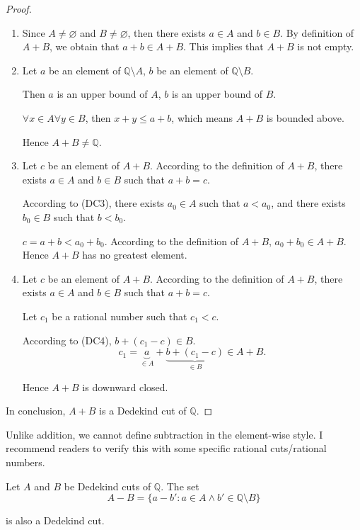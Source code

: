 \begin{proof}
    \begin{enumerate}[label={(\roman*)},itemsep=0pt]
        \item Since $A\ne\varnothing$ and $B\ne\varnothing$, then there exists $a\in A$ and $b\in B$. By definition of $A + B$, we obtain that $a + b \in A + B$. This implies that $A + B$ is not empty.
        \item Let $a$ be an element of $\mathbb{Q}\setminus A$, $b$ be an element of $\mathbb{Q}\setminus B$.

              Then $a$ is an upper bound of $A$, $b$ is an upper bound of $B$.

              $\forall x\in A\forall y\in B$, then $x + y \le a + b$, which means $A + B$ is bounded above.

              Hence $A + B\ne\mathbb{Q}$.
        \item Let $c$ be an element of $A + B$. According to the definition of $A + B$, there exists $a\in A$ and $b\in B$ such that $a + b = c$.

              According to (DC3), there exists $a_{0}\in A$ such that $a < a_{0}$, and there exists $b_{0}\in B$ such that $b < b_{0}$.

              $c = a + b < a_{0} + b_{0}$. According to the definition of $A + B$, $a_{0} + b_{0} \in A + B$. Hence $A + B$ has no greatest element.
        \item Let $c$ be an element of $A + B$. According to the definition of $A + B$, there exists $a\in A$ and $b\in B$ such that $a + b = c$.

              Let $c_{1}$ be a rational number such that $c_{1} < c$.

              According to (DC4), $b + (c_{1} - c)\in B$.
              \[
                  c_{1} = \underbrace{a}_{\in A} + \underbrace{b + (c_{1} - c)}_{\in B} \in A + B.
              \]

              Hence $A + B$ is downward closed.
    \end{enumerate}

    In conclusion, $A + B$ is a Dedekind cut of $\mathbb{Q}$.
\end{proof}

Unlike addition, we cannot define subtraction in the element-wise style. I recommend readers to verify this with some specific rational cuts/rational numbers.

\begin{theorem}[Subtraction]
    Let $A$ and $B$ be Dedekind cuts of $\mathbb{Q}$. The set
    \[
        A - B = \{ a - b': a\in A\land b'\in\mathbb{Q}\setminus B \}
    \]

    is also a Dedekind cut.
\end{theorem}

